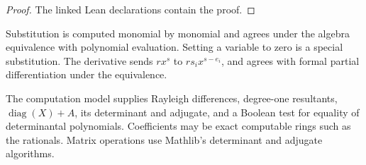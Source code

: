 \begin{proof}

\leanok

The linked Lean declarations contain the proof.

\end{proof}

\begin{definition}

\label{def:compute-operations}


\leanok


Substitution is computed monomial by monomial and agrees under the algebra equivalence
with polynomial evaluation. Setting a variable to zero is a special substitution.
The derivative sends $rx^s$ to $r s_i x^{s-e_i}$, and agrees with formal partial
differentiation under the equivalence.

\end{definition}

\begin{definition}

\label{def:compute-matrices}


\leanok


The computation model supplies Rayleigh differences, degree-one resultants,
$\operatorname{diag}(X)+A$, its determinant and adjugate, and a Boolean test for equality
of determinantal polynomials. Coefficients may be exact computable rings such as the
rationals. Matrix operations use Mathlib's determinant and adjugate algorithms.

\end{definition}

